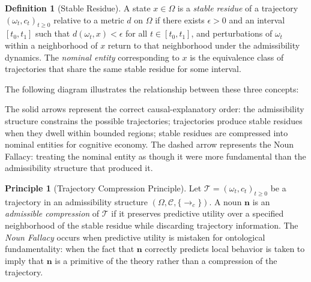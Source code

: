 \documentclass[12pt, a4paper]{article}
\theoremstyle{plain}
\theoremstyle{definition}
\newtheorem{definition}[theorem]{Definition}
\newtheorem{principle}[theorem]{Principle}
\theoremstyle{remark}
\begin{document}
\begin{definition}[Stable Residue]
A state $x \in \Omega$ is a \emph{stable residue} of a trajectory
$(\omega_t, c_t)_{t \geq 0}$ relative to a metric $d$ on $\Omega$
if there exists $\epsilon > 0$ and an interval $[t_0, t_1]$ such that
$d(\omega_t, x) < \epsilon$ for all $t \in [t_0, t_1]$, and perturbations
of $\omega_t$ within a neighborhood of $x$ return to that neighborhood
under the admissibility dynamics. The \emph{nominal entity} corresponding
to $x$ is the equivalence class of trajectories that share the same stable
residue for some interval.
\end{definition}

The following diagram illustrates the relationship between these three concepts:

\begin{center}
\end{center}

The solid arrows represent the correct causal-explanatory order: the
admissibility structure constrains the possible trajectories; trajectories
produce stable residues when they dwell within bounded regions; stable
residues are compressed into nominal entities for cognitive economy.
The dashed arrow represents the Noun Fallacy: treating the nominal entity
as though it were more fundamental than the admissibility structure that
produced it.

\begin{principle}[Trajectory Compression Principle]
\label{prin:tcp}
Let $\mathcal{T} = (\omega_t, c_t)_{t \geq 0}$ be a trajectory in an
admissibility structure $(\Omega, \mathcal{C}, \{\to_c\})$. A noun $\mathbf{n}$
is an \emph{admissible compression} of $\mathcal{T}$ if it preserves
predictive utility over a specified neighborhood of the stable residue while
discarding trajectory information. The \emph{Noun Fallacy} occurs when
predictive utility is mistaken for ontological fundamentality: when the
fact that $\mathbf{n}$ correctly predicts local behavior is taken to imply
that $\mathbf{n}$ is a primitive of the theory rather than a compression of
the trajectory.
\end{principle}
\end{document}

